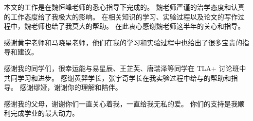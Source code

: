 \begin{acknowledgement}
  本文的工作是在魏恒峰老师的悉心指导下完成的。
  魏老师严谨的治学态度和认真的工作态度给了我极大的影响。
  在相关知识的学习、实验过程以及论文的写作过程中，魏老师也给了我莫大的帮助。
  在此衷心感谢魏老师这半年的关心和指导。

感谢黄宇老师和马晓星老师，他们在我的学习和实验过程中也给出了很多宝贵的指导和建议。

感谢我的同学们，很幸运能与易星辰、王芷芙、唐瑞泽等同学在 TLA+ 讨论班中共同学习和进步。
感谢黄羿学长，张宇奇学长在我实验过程中给与的帮助和指导。
感谢缪娅，谢谢你的理解和陪伴。

感谢我的父母，谢谢你们一直关心着我，一直给我无私的爱。
你们的支持是我顺利完成学业的最大动力。
\end{acknowledgement}